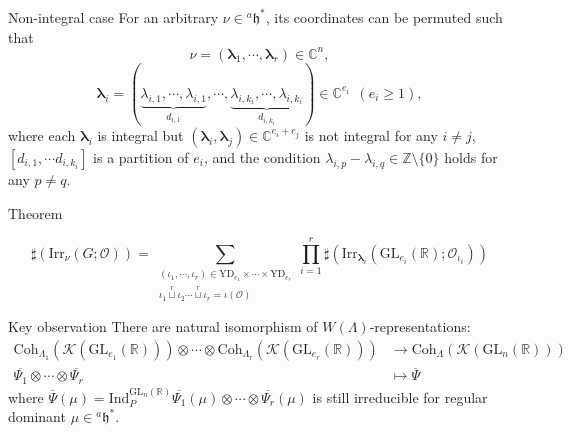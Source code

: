 \documentclass[fleqn,xcolor=dvipsnames]{beamer}
\newcommand{\blam}{{\boldsymbol{\lambda}}}
\newcommand{\BC}{{\mathbb {C}}}
\newcommand{\BR}{{\mathbb {R}}}
\newcommand{\BZ}{{\mathbb {Z}}}
\newcommand{\CK}{{\mathcal {K}}}
\newcommand{\CO}{{\mathcal {O}}}
\newcommand{\fh}{\mathfrak{h}}
\newcommand{\GL}{{\mathrm{GL}}}
\newcommand{\Ind}{{\mathrm{Ind}}}
\newcommand{\Irr}{{\mathrm{Irr}}}
\renewcommand{\bar}{\overline}
\begin{document}
\begin{frame}{Non-integral case}
  For an arbitrary $\nu \in {^{a}\fh}^*$, its coordinates can be permuted such that 
        \[
        \nu = (\blam_1, \cdots, \blam_r) \in \BC^n,
        \]
        \[
        \blam_i = (\underbrace{\lambda_{i,1}, \cdots, \lambda_{i,1}}_{d_{i,1}}, \cdots, \underbrace{\lambda_{i,k_i}, \cdots, \lambda_{i,k_i}}_{d_{i,k_i}}) \in \BC^{e_i} \ \ (e_i \geq 1),
        \]  
        where each $\blam_i$ is integral but $(\blam_i,\blam_j) \in \BC^{e_i+e_j}$ is not integral for any $i \neq j$, $[d_{i,1}, \cdots d_{i,k_i} ]$ is a partition of $e_i$, and the condition $\lambda_{i,p} - \lambda_{i,q} \in \BZ \setminus \{0\}$ holds for any $p \neq q$.
  \pause\begin{block}{Theorem}
    
        \begin{equation*}
            \sharp(\Irr_{\nu}(G;\CO)) = \sum_{\substack{(\iota_1,\cdots,\iota_r) \in \mathrm{YD}_{e_1} \times \cdots \times \mathrm{YD}_{e_r} \\ \iota_1 \mathop{\sqcup}\limits^r \iota_2 \cdots \mathop{\sqcup}\limits^r  \iota_r = \iota(\CO) }}\prod_{i=1}^{r}\sharp(\Irr_{\blam_i}(\GL_{e_i}(\BR);\CO_{\iota_i}))
        \end{equation*}
  \end{block}
\end{frame}






\begin{frame}{Key observation}
  There are natural isomorphism of $W(\Lambda)$-representations:
  \begin{align*}
    \mathrm{Coh}_{\Lambda_1}(\CK(\GL_{e_1}(\BR))) \otimes \cdots \otimes \mathrm{Coh}_{\Lambda_r}(\CK(\GL_{e_r}(\BR))) &\to \mathrm{Coh}_{\Lambda}(\CK(\GL_{n}(\BR)))\\
    \bar{\Psi_1} \otimes \cdots \otimes \bar{\Psi_r} & \mapsto \bar{\Psi}
  \end{align*}
  where $\bar{\Psi}(\mu) = \Ind_{P}^{\GL_{n}(\BR)}\bar{\Psi_1}(\mu) \otimes \cdots \otimes \bar{\Psi_r}(\mu)$ is still irreducible for regular dominant $\mu \in {^{a}\fh}^*$.
\end{frame}
\end{document}
